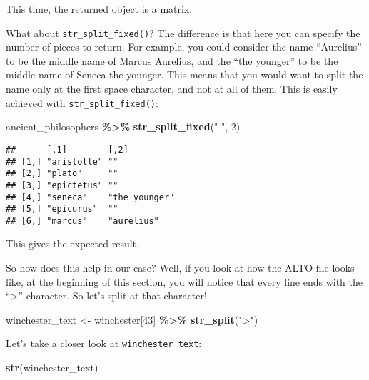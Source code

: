 \documentclass[
]{article}
\newenvironment{Shaded}{\begin{snugshade}}{\end{snugshade}}
\newcommand{\DecValTok}[1]{\textcolor[rgb]{0.00,0.00,0.81}{#1}}
\newcommand{\KeywordTok}[1]{\textcolor[rgb]{0.13,0.29,0.53}{\textbf{#1}}}
\newcommand{\NormalTok}[1]{#1}
\newcommand{\OperatorTok}[1]{\textcolor[rgb]{0.81,0.36,0.00}{\textbf{#1}}}
\newcommand{\StringTok}[1]{\textcolor[rgb]{0.31,0.60,0.02}{#1}}
\begin{document}
This time, the returned object is a matrix.

What about \texttt{str\_split\_fixed()}? The difference is that here you can specify the number of pieces
to return. For example, you could consider the name ``Aurelius'' to be the middle name of Marcus Aurelius,
and the ``the younger'' to be the middle name of Seneca the younger. This means that you would want
to split the name only at the first space character, and not at all of them. This is easily achieved
with \texttt{str\_split\_fixed()}:

\begin{Shaded}
\begin{Highlighting}[]
\NormalTok{ancient\_philosophers }\OperatorTok{\%\textgreater{}\%}
\StringTok{  }\KeywordTok{str\_split\_fixed}\NormalTok{(}\StringTok{" "}\NormalTok{, }\DecValTok{2}\NormalTok{)}
\end{Highlighting}
\end{Shaded}

\begin{verbatim}
##      [,1]        [,2]         
## [1,] "aristotle" ""           
## [2,] "plato"     ""           
## [3,] "epictetus" ""           
## [4,] "seneca"    "the younger"
## [5,] "epicurus"  ""           
## [6,] "marcus"    "aurelius"
\end{verbatim}

This gives the expected result.

So how does this help in our case? Well, if you look at how the ALTO file looks like, at the beginning
of this section, you will notice that every line ends with the ``\textgreater{}'' character. So let's split at
that character!

\begin{Shaded}
\begin{Highlighting}[]
\NormalTok{winchester\_text \textless{}{-}}\StringTok{ }\NormalTok{winchester[}\DecValTok{43}\NormalTok{] }\OperatorTok{\%\textgreater{}\%}
\StringTok{  }\KeywordTok{str\_split}\NormalTok{(}\StringTok{"\textgreater{}"}\NormalTok{)}
\end{Highlighting}
\end{Shaded}

Let's take a closer look at \texttt{winchester\_text}:

\begin{Shaded}
\begin{Highlighting}[]
\KeywordTok{str}\NormalTok{(winchester\_text)}
\end{Highlighting}
\end{Shaded}
\end{document}
